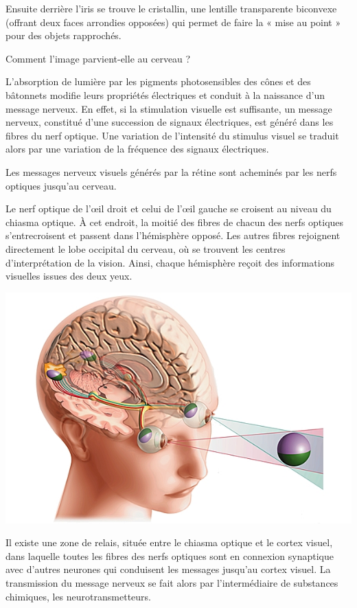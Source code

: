 \documentclass[a4paper, 12pt, onecolumn, openany]{report}
\begin{document}
	Ensuite derrière l'iris se trouve le cristallin, une lentille transparente biconvexe (offrant deux faces arrondies opposées) qui permet de faire la « mise au point » pour des objets rapprochés.
	
	Comment l'image parvient-elle au cerveau ?
	
	L'absorption de lumière par les pigments photosensibles des cônes et des bâtonnets modifie leurs propriétés électriques et conduit à la naissance d'un message nerveux. En effet, si la stimulation visuelle est suffisante, un message nerveux, constitué d'une succession de signaux électriques, est généré dans les fibres du nerf optique. Une variation de l'intensité du stimulus visuel se traduit alors par une variation de la fréquence des signaux électriques.
	
	Les messages nerveux visuels générés par la rétine sont acheminés par les nerfs optiques jusqu'au cerveau.
	
	Le nerf optique de l'œil droit et celui de l'œil gauche se croisent au niveau du chiasma optique. À cet endroit, la moitié des fibres de chacun des nerfs optiques s'entrecroisent et passent dans l'hémisphère opposé. Les autres fibres rejoignent directement le lobe occipital du cerveau, où se trouvent les centres d'interprétation de la vision. Ainsi, chaque hémisphère reçoit des informations visuelles issues des deux yeux.
		
	\includegraphics[scale=0.7]{deux_yeux.jpg}		
	
	Il existe une zone de relais, située entre le chiasma optique et le cortex visuel, dans laquelle toutes les fibres des nerfs optiques sont en connexion synaptique avec d'autres neurones qui conduisent les messages jusqu'au cortex visuel. La transmission du message nerveux se fait alors par l'intermédiaire de substances chimiques, les neurotransmetteurs.
	
\end{document}
